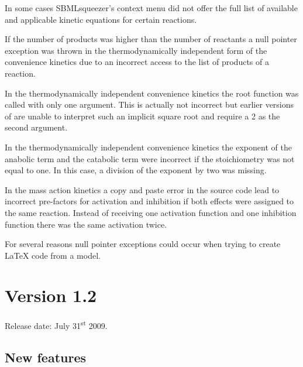 \begin{dinglist}{54}
\item In some cases SBMLsqueezer's context menu did not offer the full list of
available and applicable kinetic equations for certain reactions.

\item If the number of products was higher than the number of reactants a null pointer
exception was thrown in the thermodynamically independent form of the
convenience kinetics due to an incorrect access to the list of products of a
reaction.

\item In the thermodynamically independent convenience kinetics the root function was
called with only one argument. This is actually not incorrect but earlier
versions of \libSBML are unable to interpret such an implicit square root and
require a 2 as the second argument.

\item In the thermodynamically independent convenience kinetics the exponent of the
anabolic term and the catabolic term were incorrect if the stoichiometry was not
equal to one. In this case, a division of the exponent by two was missing.

\item In the mass action kinetics a copy and paste error in the source code lead to
incorrect pre-factors for activation and inhibition if both effects were
assigned to the same reaction. Instead of receiving one activation function and
one inhibition function there was the same activation twice.

\item For several reasons null pointer exceptions could occur when trying to create
\LaTeX{} code from a model.
\end{dinglist}


\section{Version 1.2}

Release date: July 31\textsuperscript{st} 2009.

\subsection{New features}

